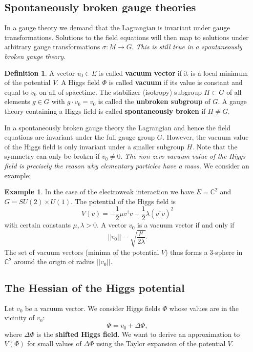 \documentclass[12pt]{amsart}
\theoremstyle{definition}
\newtheorem{ex}[thm]{Example}
\newtheorem{defn}[thm]{Definition}
\theoremstyle{remark}
\numberwithin{equation}{section}
\begin{document}
\subsection{Spontaneously broken gauge theories}
In a gauge theory we demand that the Lagrangian is invariant under gauge transformations. Solutions to the field equations will then map to solutions under arbitrary gauge transformations $\sigma\colon M\rightarrow G$. {\em This is still true in a spontaneously broken gauge theory.} 
\begin{defn} A vector $v_0\in E$ is called {\bf vacuum vector} if it is a local minimum of the potential $V$. A Higgs field $\Phi$ is called {\bf vacuum} if its value is constant and equal to $v_0$ on all of spacetime. The stabilizer (isotropy) subgroup $H\subset G$ of all elements $g\in G$ with $g\cdot v_0=v_0$ is called the {\bf unbroken subgroup} of $G$. A gauge theory containing a Higgs field is called {\bf spontaneously broken} if $H\neq G$.
\end{defn}
In a spontaneously broken gauge theory the Lagrangian and hence the field equations are invariant under the full gauge group $G$. However, the vacuum value of the Higgs field is only invariant under a smaller subgroup $H$. Note that the symmetry can only be broken if $v_0\neq 0$. {\em The non-zero vacuum value of the Higgs field is precisely the reason why elementary particles have a mass.} We consider an example:

\begin{ex}\label{ex Higgs field potential} In the case of the electroweak interaction we have $E=\mathbb{C}^2$ and $G=SU(2)\times U(1)$. The potential of the Higgs field is
\begin{equation*}
V(v)=-\frac{1}{2}\mu v^\dagger v+\frac{1}{2}\lambda\left(v^\dagger v\right)^2
\end{equation*}
with certain constants $\mu,\lambda>0$. A vector $v_0$ is a vacuum vector if and only if 
\begin{equation*}
||v_0||=\sqrt{\frac{\mu}{2\lambda}}.
\end{equation*} 
The set of vacuum vectors (minima of the potential $V$) thus forms a 3-sphere in $\mathbb{C}^2$ around the origin of radius $||v_0||$.
\end{ex}

\subsection{The Hessian of the Higgs potential}
Let $v_0$ be a vacuum vector. We consider Higgs fields $\Phi$ whose values are in the vicinity of $v_0$:
\begin{equation*}
\Phi=v_0+\Delta\Phi,
\end{equation*} 
where $\Delta\Phi$ is the {\bf shifted Higgs field}. We want to derive an approximation to $V(\Phi)$ for small values of $\Delta\Phi$ using the Taylor expansion of the potential $V$.
\end{document}
